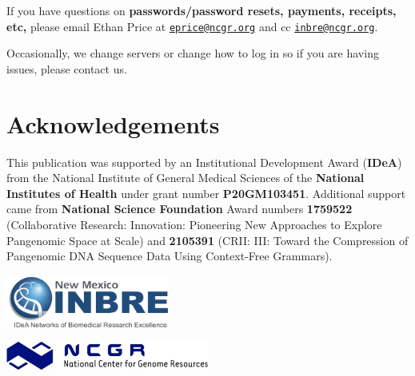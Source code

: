\documentclass[
]{book}
\begin{document}
If you have questions on \textbf{passwords/password resets, payments, receipts, etc,} please email Ethan Price at \href{mailto:eprice@ncgr.org}{\nolinkurl{eprice@ncgr.org}} and cc \href{mailto:inbre@ncgr.org}{\nolinkurl{inbre@ncgr.org}}.

Occasionally, we change servers or change how to log in so if you are having issues, please contact us.

\hypertarget{acknowledgements}{%
\chapter*{Acknowledgements}\label{acknowledgements}}

This publication was supported by an Institutional Development Award (\textbf{IDeA}) from the National Institute of General Medical Sciences of the \textbf{National Institutes of Health} under grant number \textbf{P20GM103451}. Additional support came from \textbf{National Science Foundation} Award numbers \textbf{1759522} (Collaborative Research: Innovation: Pioneering New Approaches to Explore Pangenomic Space at Scale) and \textbf{2105391} (CRII: III: Toward the Compression of Pangenomic DNA Sequence Data Using Context-Free Grammars).

\includegraphics[width=0.4\textwidth,height=\textheight]{./Figures/INBRE_Logo_Grad_transparent-2019.png}

\includegraphics[width=0.5\textwidth,height=\textheight]{./Figures/ncgr.png}

  
\end{document}
